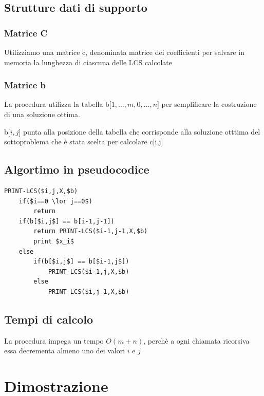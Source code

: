 \subsection{Strutture dati di supporto}
\subsubsection{Matrice C}
Utilizziamo una matrice c, denominata matrice dei coefficienti per salvare in memoria la lunghezza di ciascuna delle LCS calcolate

\subsubsection{Matrice b}
La procedura utilizza la tabella b[$1,\dots,m,0,\dots,n$] per semplificare la costruzione di una soluzione ottima.

b[$i,j$] punta alla posizione della tabella che corrisponde alla soluzione otttima del sottoproblema che è stata scelta per calcolare c[i,j]


\subsection{Algortimo in pseudocodice}
\begin{lstlisting}
PRINT-LCS($i,j,X,$b)
    if($i==0 \lor j==0$)
        return
    if(b[$i,j$] == b[i-1,j-1])
        return PRINT-LCS($i-1,j-1,X,$b)
        print $x_i$
    else
        if(b[$i,j$] == b[$i-1,j$])
            PRINT-LCS($i-1,j,X,$b)
        else
            PRINT-LCS($i,j-1,X,$b)
\end{lstlisting}

\subsection{Tempi di calcolo}
La procedura impega un tempo $O(m+n)$, perchè a ogni chiamata ricorsiva essa decrementa almeno uno dei valori $i$ e $j$

\newpage
\section{Dimostrazione}